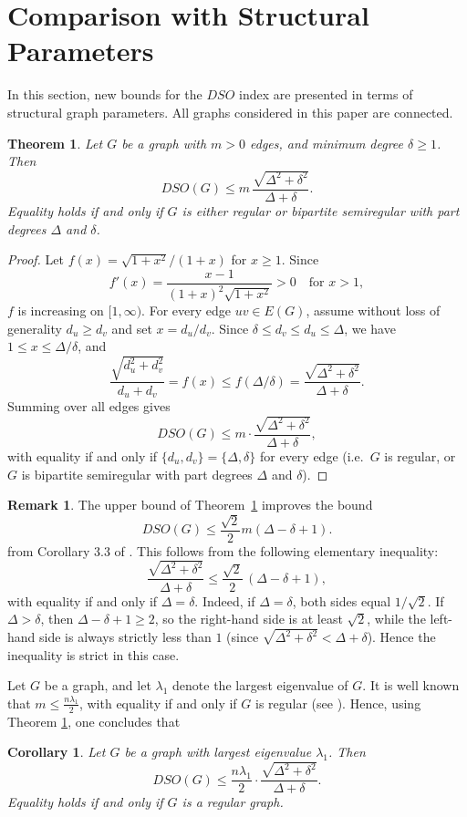 \documentclass{article}
\newtheorem{theorem}{Theorem}
\newtheorem{corollary}{Corollary}
\theoremstyle{definition}
\newtheorem{remark}{Remark}
\begin{document}
\section{Comparison with Structural Parameters}
In this section, new bounds for the $DSO$ index are presented in terms of structural graph parameters.
All graphs considered in this paper are connected.
\begin{theorem}\label{Delta-delta}
Let $G$ be a graph with $m>0$ edges, and minimum degree $\delta\ge 1$. Then
\[
DSO(G) \le m\,\frac{\sqrt{\Delta^{2}+\delta^{2}}}{\Delta+\delta}.
\]
Equality holds if and only if $G$ is either regular  or bipartite semiregular with part degrees $\Delta$ and $\delta$.
\end{theorem}
\begin{proof}
Let $f(x)=\sqrt{1+x^2}/(1+x)$ for $x\ge 1$. Since
\[
f'(x)=\frac{x-1}{(1+x)^2\sqrt{1+x^2}}>0 \quad\text{for } x>1,
\]
$f$ is increasing on $[1,\infty)$. For every edge $uv\in E(G)$, assume without loss of generality $d_u\ge d_v$ and set $x=d_u/d_v$. Since $\delta\le d_v\le d_u\le \Delta$, we have $1\le x\le \Delta/\delta$, and
\[
\frac{\sqrt{d_u^2+d_v^2}}{d_u+d_v}=f(x)\le f(\Delta/\delta)=\frac{\sqrt{\Delta^2+\delta^2}}{\Delta+\delta}.
\]
Summing over all edges gives
\begin{equation}\label{eqn-step1}
DSO(G)\le m\cdot\frac{\sqrt{\Delta^2+\delta^2}}{\Delta+\delta},
\end{equation}
with equality if and only if $\{d_u,d_v\}=\{\Delta,\delta\}$ for every edge (i.e.\ $G$ is regular, or $G$ is bipartite semiregular with part degrees $\Delta$ and $\delta$).
\end{proof}
\begin{remark}
The upper bound of Theorem~\ref{Delta-delta} improves the bound
\[
DSO(G)\le \frac{\sqrt{2}}{2}m(\Delta-\delta+1).
\]
from Corollary 3.3 of \cite{5}. 
This follows from the following elementary inequality:
\[
\frac{\sqrt{\Delta^2+\delta^2}}{\Delta+\delta}
\le \frac{\sqrt{2}}{2}\,(\Delta-\delta+1),
\]
with equality if and only if $\Delta=\delta$.
Indeed, if $\Delta=\delta$, both sides equal $1/\sqrt{2}$. If $\Delta>\delta$, then $\Delta-\delta+1\ge 2$, so the right-hand side is at least $\sqrt{2}$, while the left-hand side is always strictly less than $1$ (since $\sqrt{\Delta^2+\delta^2}<\Delta+\delta$). Hence the inequality is strict in this case.
\end{remark}
Let $G$ be a  graph, and let $\lambda_1$ denote the largest eigenvalue of $G$.
It is well known that $m\le \frac{n\lambda_1}{2}$, with equality if and only if $G$ is regular (see \cite{4}). Hence, using Theorem \ref{Delta-delta}, one concludes that
\begin{corollary}
Let $G$ be a graph with largest eigenvalue $\lambda_1$. Then
\[
DSO(G)\le \frac{n\lambda_1}{2}\cdot\frac{\sqrt{\Delta^2+\delta^2}}{\Delta+\delta}.
\]
Equality holds if and only if $G$ is a regular graph.
\end{corollary}
\end{document}

